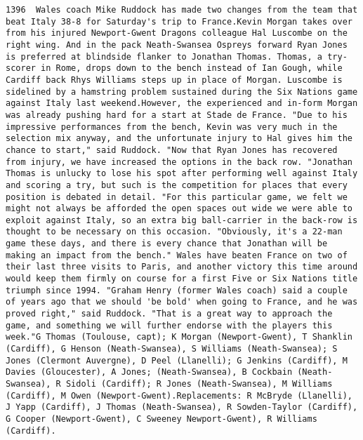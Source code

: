 \documentclass[11pt]{article}
\begin{document}
\begin{Verbatim}[commandchars=\\\{\}]
         1396  Wales coach Mike Ruddock has made two changes from the team that beat Italy 38-8 for Saturday's trip to France.Kevin Morgan takes over from his injured Newport-Gwent Dragons colleague Hal Luscombe on the right wing. And in the pack Neath-Swansea Ospreys forward Ryan Jones is preferred at blindside flanker to Jonathan Thomas. Thomas, a try-scorer in Rome, drops down to the bench instead of Ian Gough, while Cardiff back Rhys Williams steps up in place of Morgan. Luscombe is sidelined by a hamstring problem sustained during the Six Nations game against Italy last weekend.However, the experienced and in-form Morgan was already pushing hard for a start at Stade de France. "Due to his impressive performances from the bench, Kevin was very much in the selection mix anyway, and the unfortunate injury to Hal gives him the chance to start," said Ruddock. "Now that Ryan Jones has recovered from injury, we have increased the options in the back row. "Jonathan Thomas is unlucky to lose his spot after performing well against Italy and scoring a try, but such is the competition for places that every position is debated in detail. "For this particular game, we felt we might not always be afforded the open spaces out wide we were able to exploit against Italy, so an extra big ball-carrier in the back-row is thought to be necessary on this occasion. "Obviously, it's a 22-man game these days, and there is every chance that Jonathan will be making an impact from the bench." Wales have beaten France on two of their last three visits to Paris, and another victory this time around would keep them firmly on course for a first Five or Six Nations title triumph since 1994. "Graham Henry (former Wales coach) said a couple of years ago that we should 'be bold' when going to France, and he was proved right," said Ruddock. "That is a great way to approach the game, and something we will further endorse with the players this week."G Thomas (Toulouse, capt); K Morgan (Newport-Gwent), T Shanklin (Cardiff), G Henson (Neath-Swansea), S Williams (Neath-Swansea); S Jones (Clermont Auvergne), D Peel (Llanelli); G Jenkins (Cardiff), M Davies (Gloucester), A Jones; (Neath-Swansea), B Cockbain (Neath-Swansea), R Sidoli (Cardiff); R Jones (Neath-Swansea), M Williams (Cardiff), M Owen (Newport-Gwent).Replacements: R McBryde (Llanelli), J Yapp (Cardiff), J Thomas (Neath-Swansea), R Sowden-Taylor (Cardiff), G Cooper (Newport-Gwent), C Sweeney Newport-Gwent), R Williams (Cardiff).                                                                                                                                                                                                                                                                                                                                                                                                                                                                                                                                                                                                                                                                                                                                                                                                                                    
\end{Verbatim}
\end{document}
